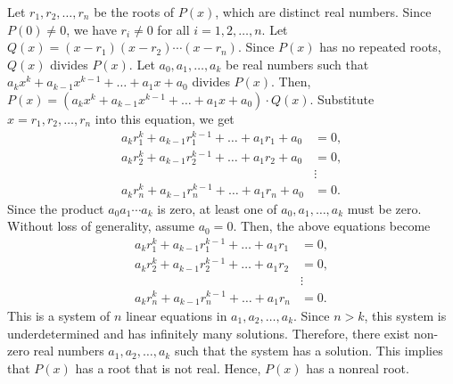 Let $r_1, r_2, \ldots, r_n$ be the roots of $P(x)$, which are distinct real numbers.  
Since $P(0) \neq 0$, we have $r_i \neq 0$ for all $i = 1, 2, \ldots, n$.  
Let $Q(x) = (x-r_1)(x-r_2)\cdots(x-r_n)$.  
Since $P(x)$ has no repeated roots, $Q(x)$ divides $P(x)$.  
Let $a_0, a_1, \ldots, a_k$ be real numbers such that $a_k x^k + a_{k-1}x^{k-1} + \ldots + a_1 x + a_0$ divides $P(x)$.  
Then, $P(x) = (a_k x^k + a_{k-1}x^{k-1} + \ldots + a_1 x + a_0) \cdot Q(x)$.  
Substitute $x = r_1, r_2, \ldots, r_n$ into this equation, we get
\begin{align*} a_k r_1^k + a_{k-1}r_1^{k-1} + \ldots + a_1 r_1 + a_0 &= 0, \\ a_k r_2^k + a_{k-1}r_2^{k-1} + \ldots + a_1 r_2 + a_0 &= 0, \\ &\vdots \\ a_k r_n^k + a_{k-1}r_n^{k-1} + \ldots + a_1 r_n + a_0 &= 0. \end{align*}  
Since the product $a_0 a_1 \cdots a_k$ is zero, at least one of $a_0, a_1, \ldots, a_k$ must be zero.  
Without loss of generality, assume $a_0 = 0$.  
Then, the above equations become
\begin{align*} a_k r_1^k + a_{k-1}r_1^{k-1} + \ldots + a_1 r_1 &= 0, \\ a_k r_2^k + a_{k-1}r_2^{k-1} + \ldots + a_1 r_2 &= 0, \\ &\vdots \\ a_k r_n^k + a_{k-1}r_n^{k-1} + \ldots + a_1 r_n &= 0. \end{align*}  
This is a system of $n$ linear equations in $a_1, a_2, \ldots, a_k$.  
Since $n > k$, this system is underdetermined and has infinitely many solutions.  
Therefore, there exist non-zero real numbers $a_1, a_2, \ldots, a_k$ such that the system has a solution.  
This implies that $P(x)$ has a root that is not real.  
Hence, $P(x)$ has a nonreal root.
